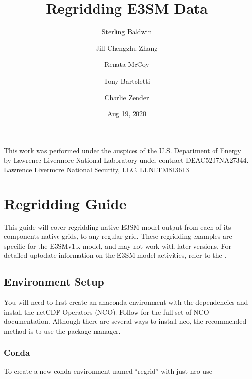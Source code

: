 \documentclass[letterpaper,10pt,english]{sphinxmanual}
\title{Regridding E3SM Data}
\date{Aug 19, 2020}
\author{Sterling Baldwin \and Jill Chengzhu Zhang \and Renata McCoy \and Tony Bartoletti \and Charlie Zender}
\begin{document}
\pagestyle{empty}
\sphinxmaketitle
\pagestyle{plain}
\sphinxtableofcontents
\pagestyle{normal}
\label{\detokenize{index::doc}}


This work was performed under the auspices of the U.S. Department of Energy by Lawrence Livermore National Laboratory under contract DE\sphinxhyphen{}AC52\sphinxhyphen{}07NA27344.
Lawrence Livermore National Security, LLC. LLNL\sphinxhyphen{}TM\sphinxhyphen{}813613


\chapter{Regridding Guide}
\label{\detokenize{guide:regridding-guide}}\label{\detokenize{guide:guide}}\label{\detokenize{guide::doc}}
This guide will cover regridding native E3SM model output from each of its components native grids, to
any regular grid. These regridding examples are specific for the E3SMv1.x model, and may not work with later versions. For detailed up\sphinxhyphen{}to\sphinxhyphen{}date information on the
E3SM model activities, refer to the .


\section{Environment Setup}
\label{\detokenize{guide:environment-setup}}
You will need to first create an anaconda environment with the dependencies and install the netCDF Operators (NCO).
Follow  for the full set of NCO documentation.
Although there are several ways to install nco, the recommended method is to use the  package manager.


\subsection{Conda}
\label{\detokenize{guide:id1}}
\begin{sphinxVerbatim}[commandchars=\\\{\}]
    
\end{sphinxVerbatim}

To create a new conda environment named “regrid” with just nco use:

\begin{sphinxVerbatim}[commandchars=\\\{\}]
      
\end{sphinxVerbatim}
\end{document}
